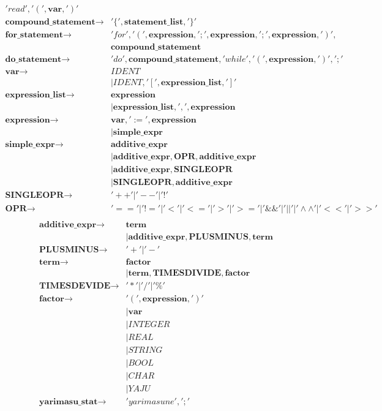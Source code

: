 \documentclass{article}
\begin{document}
\begin{align}
	  'read','(',\textbf{var},')'\\
	  \textbf{compound\_statement} \rightarrow &
	  '\lbrace', \textbf{statement\_list}, '\rbrace'\\
	  \textbf{for\_statement} \rightarrow &
	  'for','(',\textbf{expression},';',\textbf{expression},';',\textbf{expression},')',\\ &\textbf{compound\_statement}\\
	  \textbf{do\_statement} \rightarrow &
	  'do',\textbf{compound\_statement},'while','(',\textbf{expression},')',';'\\
	  \textbf{var} \rightarrow &
	  IDENT\\
	  &|IDENT, '[',\textbf{expression\_list},']'\\
	  \textbf{expression\_list} \rightarrow &
	  \textbf{expression} \\
	  &|\textbf{expression\_list}, ',', \textbf{expression}\\
	  \textbf{expression} \rightarrow &
	  \textbf{var},':=',\textbf{expression} \\
	  &|\textbf{simple\_expr}\\
	  \textbf{simple\_expr} \rightarrow &
	  \textbf{additive\_expr} \\
	  &|\textbf{additive\_expr},\textbf{OPR},\textbf{additive\_expr}\\
	  &|\textbf{additive\_expr},\textbf{SINGLEOPR}\\
	  &|\textbf{SINGLEOPR},\textbf{additive\_expr}\\
	  \textbf{SINGLEOPR} \rightarrow &
	  '++' | '--' | '!'\\
	  \textbf{OPR} \rightarrow & 
	  '=='|'!='|'<'|'<='|'>'|'>='|'\&\&'|'||'|'\wedge\wedge'|'<<'|'>>'\\
		\end{align}
		\begin{align}
		\textbf{additive\_expr} \rightarrow &
		\textbf{term} \\
		&|\textbf{additive\_expr}, \textbf{PLUSMINUS},\textbf{term}\\
		\textbf{PLUSMINUS} \rightarrow &
		'+'|'-'\\
		\textbf{term} \rightarrow &
		\textbf{factor} \\
		&| \textbf{term},\textbf{TIMESDIVIDE},\textbf{factor}\\
		\textbf{TIMESDEVIDE} \rightarrow &
		'*'|'/'|'\%'\\
		\textbf{factor} \rightarrow &
		'(',\textbf{expression},')'\\
		&|\textbf{var}\\
		&|INTEGER \\
		&|REAL \\
		&|STRING \\
		&|BOOL\\
		&|CHAR\\
		&|YAJU\\
		\textbf{yarimasu\_stat} \rightarrow &
		'yarimasune',';'\\
		\end{align}
\end{document}
